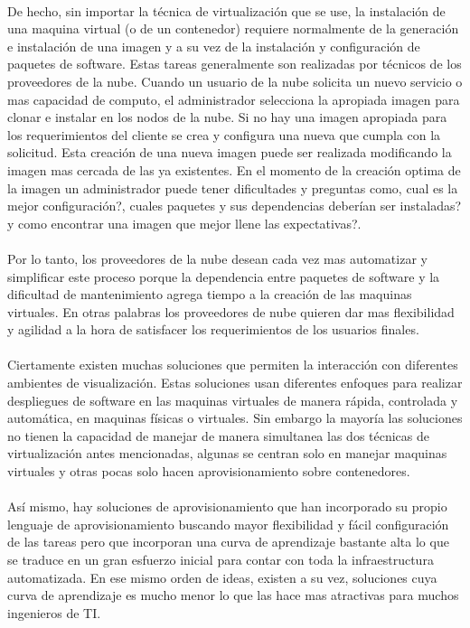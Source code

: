 \\
De hecho, sin importar la técnica de virtualización que se use, la instalación de una maquina virtual (o de un contenedor) requiere normalmente de la generación e instalación de una imagen y a su vez de la instalación y configuración de paquetes de software. Estas tareas generalmente son realizadas por técnicos de los proveedores de la nube. Cuando un usuario de la nube solicita un nuevo servicio o mas capacidad de computo, el administrador selecciona la apropiada imagen para clonar e instalar en los nodos de la nube. Si no hay una imagen apropiada para los requerimientos del cliente se crea y configura una nueva que cumpla con la solicitud. Esta creación de una nueva imagen puede ser realizada modificando la imagen mas cercada de las ya existentes. En el momento de la creación optima de la imagen un administrador puede tener dificultades y preguntas como, cual es la mejor configuración?, cuales paquetes y sus dependencias deberían ser instaladas? y como encontrar una imagen que mejor llene las expectativas?.\\
\\
Por lo tanto, los proveedores de la nube desean cada vez mas automatizar y simplificar este proceso porque la dependencia entre paquetes de software y la dificultad de mantenimiento agrega tiempo a la creación de las maquinas virtuales. En otras palabras los proveedores de nube quieren dar mas flexibilidad y agilidad a la hora de satisfacer los requerimientos de los usuarios finales.\\
\\
Ciertamente existen muchas soluciones que permiten la interacción con diferentes ambientes de visualización. Estas soluciones usan diferentes enfoques para realizar despliegues de software en las maquinas virtuales de manera rápida, controlada y automática, en maquinas físicas o virtuales. Sin embargo la mayoría las soluciones no tienen la capacidad de manejar de manera simultanea las dos técnicas de virtualización antes mencionadas, algunas se centran solo en manejar maquinas virtuales y otras pocas solo hacen aprovisionamiento sobre contenedores.\\
\\
Así mismo, hay soluciones de aprovisionamiento que han incorporado su propio lenguaje de aprovisionamiento buscando mayor flexibilidad y fácil configuración de las tareas pero que incorporan una curva de aprendizaje bastante alta lo que se traduce en un gran esfuerzo inicial para contar con toda la infraestructura automatizada. En ese mismo orden de ideas, existen a su vez, soluciones cuya curva de aprendizaje es mucho menor lo que las hace mas atractivas para muchos ingenieros de TI.\\
